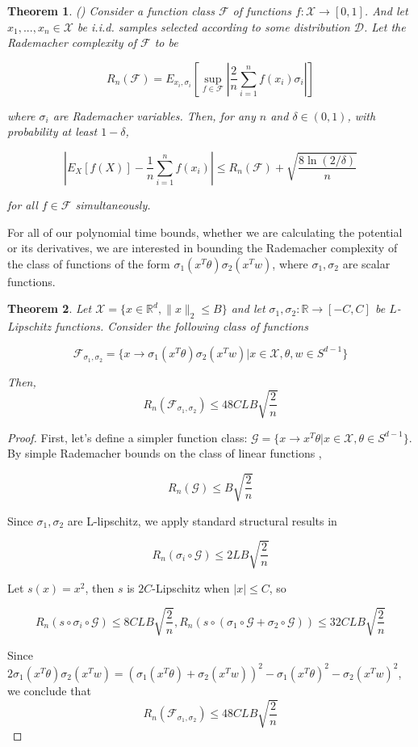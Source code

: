 \documentclass{article}
\newtheorem{theorem}{Theorem}[section]
\newcommand{\R}{{\mathbb{R}}}
\begin{document}
\begin{theorem} (\cite{bartlett2002rademacher}) Consider a function class $\mathcal{F}$ of functions $f : \mathcal{X} \to [0,1]$. And let $ x_1,...,x_n \in \mathcal{X}$ be i.i.d. samples selected according to some distribution $\mathcal{D}$. Let the Rademacher complexity of $\mathcal{F}$ to be 

\[R_n (\mathcal{F}) = E_{x_i,\sigma_i}\left[\sup_{f \in \mathcal{F}} \left|\frac{2}{n}\sum_{i=1}^nf(x_i)\sigma_i\right|\right]\]

where $\sigma_i$ are Rademacher variables. Then, for any $n$ and $\delta \in (0,1)$, with probability at least $1-\delta$, 


\[|E_{X}[f(X)]  - \frac{1}{n}\sum_{i=1}^n f(x_i)| \leq R_n(\mathcal{F}) + \sqrt{\frac{8\ln(2/\delta)}{n}} \]

for all $f \in\mathcal{F}$ simultaneously.
\end{theorem}

For all of our polynomial time bounds, whether we are calculating the potential or its derivatives, we are interested in bounding the Rademacher complexity of the class of functions of the form $\sigma_1(x^T\theta) \sigma_2(x^Tw)$, where $\sigma_1,\sigma_2$ are scalar functions.




\begin{theorem}
Let $\mathcal{X} = \{x \in \R^d, \|x\|_2\leq B\}$ and let $\sigma_1,\sigma_2 : \R \to [-C,C]$ be $L$-Lipschitz functions. Consider the following class of functions

\[\mathcal{F}_{\sigma_1,\sigma_2} = \{x\to\sigma_1(x^T\theta) \sigma_2(x^Tw) | x\in\mathcal{X}, \theta, w \in S^{d-1}\}\]

Then, \[R_n(\mathcal{F}_{\sigma_1,\sigma_2}) \leq 48CLB\sqrt{\frac{2}{n}}\]

\end{theorem}

\begin{proof}
First, let's define a simpler function class: $\mathcal{G} = \{x\to x^T\theta  | x\in\mathcal{X}, \theta \in S^{d-1}\}$. By simple Rademacher bounds on the class of linear functions \cite{kakade2009complexity}, 
 
 \[R_n(\mathcal{G}) \leq B\sqrt{\frac{2}{n}}\]
 
Since $\sigma_1,\sigma_2$ are L-lipschitz, we apply standard structural results in \cite{bartlett2002rademacher}

\[R_n(\sigma_i\circ \mathcal{G}) \leq 2LB\sqrt{\frac{2}{n}}\]

Let $s(x) = x^2$, then $s$ is $2C$-Lipschitz when $|x|\leq C$, so 

\[R_n(s\circ \sigma_i\circ\mathcal{G}) \leq 8CLB\sqrt{\frac{2}{n}}, R_n(s\circ(\sigma_1\circ \mathcal{G} +\sigma_2\circ \mathcal{G})) \leq 32 CLB\sqrt{\frac{2}{n}}\]
 
Since $2\sigma_1(x^T\theta)\sigma_2(x^Tw) = (\sigma_1(x^T\theta)+\sigma_2(x^Tw))^2 - \sigma_1(x^T\theta)^2 - \sigma_2(x^Tw)^2$, we conclude that 
\[R_n (\mathcal{F}_{\sigma_1,\sigma_2}) \leq 48CLB\sqrt{\frac{2}{n}}\]
\end{proof}
\end{document}
